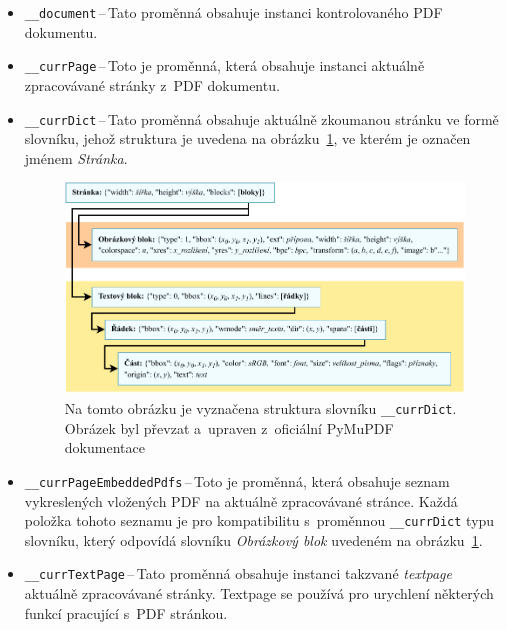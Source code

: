 \begin{itemize}
    \item \texttt{\_\_document}\,--\,Tato proměnná obsahuje instanci
    kontrolovaného PDF dokumentu.

    \item \texttt{\_\_currPage}\,--\,Toto je proměnná, která obsahuje instanci
    aktuálně zpracovávané strán\-ky z~PDF dokumentu.

    \item \texttt{\_\_currDict}\,--\,Tato proměnná obsahuje aktuálně
    zkoumanou stránku ve formě slovníku, jehož struktura je uvedena na
    obrázku~\ref{pic_curr_page_dict}, ve kterém je označen jménem \emph{Stránka}.
    \begin{figure}[H]
        \centering
        \includegraphics[width=\linewidth]{obrazky-figures/page_dictionary.pdf}
        \caption{
            Na tomto obrázku je vyznačena struktura slovníku \texttt{\_\_currDict}.
            Obrázek byl převzat a~upraven z~oficiální PyMuPDF 
            dokumentace~\cite[Sekce: \emph{TextPage}]{PyMuPDF} 
            }
        \label{pic_curr_page_dict}
    \end{figure}

    \item \texttt{\_\_currPageEmbeddedPdfs}\,--\,Toto je proměnná, která obsahuje
    seznam vykreslených vložených PDF na aktuálně zpracovávané stránce. Každá
    položka tohoto seznamu je pro kompatibilitu s~proměnnou \texttt{\_\_currDict}
    typu slovníku, který odpovídá slovníku \emph{Obrázkový blok} uvedeném na
    obrázku~\ref{pic_curr_page_dict}. 
    
    \item \texttt{\_\_currTextPage}\,--\,Tato proměnná obsahuje instanci
    takzvané \emph{textpage} aktuálně zpracovávané stránky. Textpage se používá
    pro urychlení některých funkcí pracující s~PDF stránkou.
    

\end{itemize}
